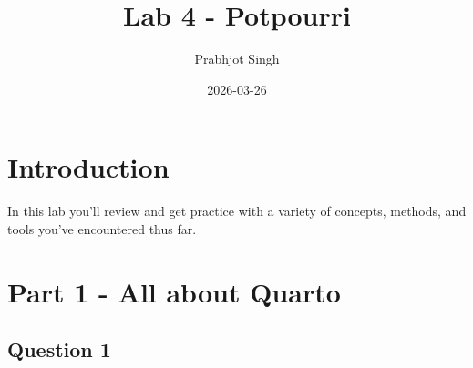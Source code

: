 \documentclass[
  letterpaper,
  DIV=11,
  numbers=noendperiod]{scrartcl}
\title{Lab 4 - Potpourri}
\author{Prabhjot Singh}
\date{2026-03-26}
\begin{document}
\maketitle


\section{Introduction}\label{introduction}

In this lab you'll review and get practice with a variety of concepts,
methods, and tools you've encountered thus far.

\section{Part 1 - All about Quarto}\label{part-1---all-about-quarto}

\subsection{Question 1}\label{question-1}
\end{document}
